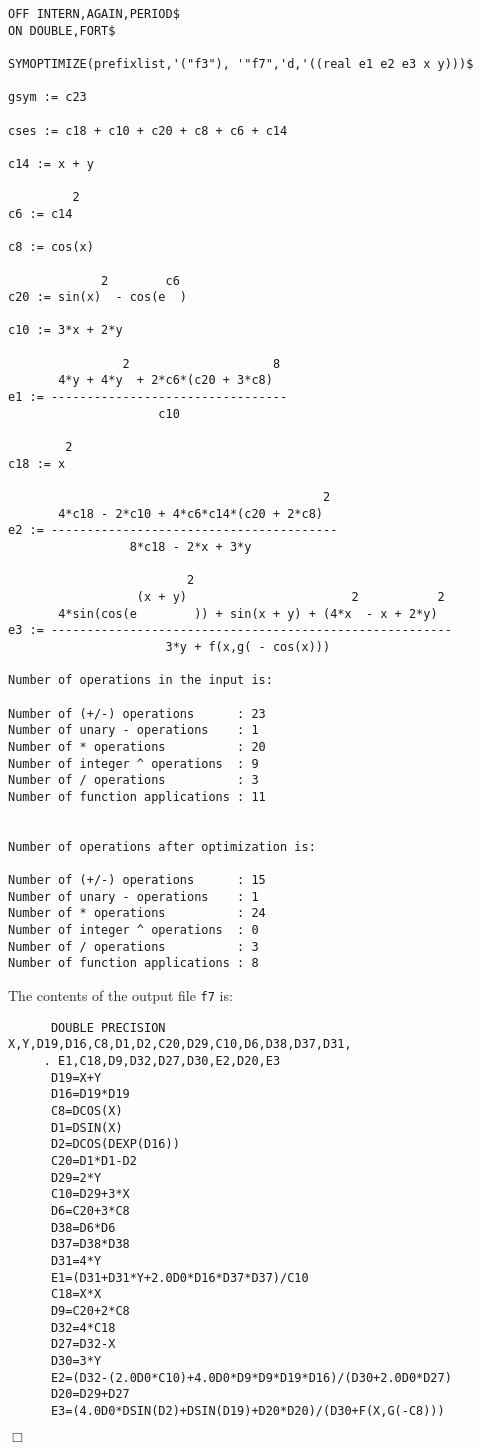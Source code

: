 {\small
\begin{verbatim}
OFF INTERN,AGAIN,PERIOD$
ON DOUBLE,FORT$

SYMOPTIMIZE(prefixlist,'("f3"), '"f7",'d,'((real e1 e2 e3 x y)))$

gsym := c23

cses := c18 + c10 + c20 + c8 + c6 + c14

c14 := x + y

         2
c6 := c14

c8 := cos(x)

             2        c6
c20 := sin(x)  - cos(e  )

c10 := 3*x + 2*y

                2                    8
       4*y + 4*y  + 2*c6*(c20 + 3*c8)
e1 := ---------------------------------
                     c10

        2
c18 := x

                                            2
       4*c18 - 2*c10 + 4*c6*c14*(c20 + 2*c8)
e2 := ----------------------------------------
                 8*c18 - 2*x + 3*y

                         2
                  (x + y)                       2           2
       4*sin(cos(e        )) + sin(x + y) + (4*x  - x + 2*y)
e3 := --------------------------------------------------------
                      3*y + f(x,g( - cos(x)))

Number of operations in the input is:

Number of (+/-) operations      : 23
Number of unary - operations    : 1
Number of * operations          : 20
Number of integer ^ operations  : 9
Number of / operations          : 3
Number of function applications : 11


Number of operations after optimization is:

Number of (+/-) operations      : 15
Number of unary - operations    : 1
Number of * operations          : 24
Number of integer ^ operations  : 0
Number of / operations          : 3
Number of function applications : 8
\end{verbatim}}

The contents of the output file {\tt f7} is:
{\small
\begin{verbatim}
      DOUBLE PRECISION X,Y,D19,D16,C8,D1,D2,C20,D29,C10,D6,D38,D37,D31,
     . E1,C18,D9,D32,D27,D30,E2,D20,E3
      D19=X+Y
      D16=D19*D19
      C8=DCOS(X)
      D1=DSIN(X)
      D2=DCOS(DEXP(D16))
      C20=D1*D1-D2
      D29=2*Y
      C10=D29+3*X
      D6=C20+3*C8
      D38=D6*D6
      D37=D38*D38
      D31=4*Y
      E1=(D31+D31*Y+2.0D0*D16*D37*D37)/C10
      C18=X*X
      D9=C20+2*C8
      D32=4*C18
      D27=D32-X
      D30=3*Y
      E2=(D32-(2.0D0*C10)+4.0D0*D9*D9*D19*D16)/(D30+2.0D0*D27)
      D20=D29+D27
      E3=(4.0D0*DSIN(D2)+DSIN(D19)+D20*D20)/(D30+F(X,G(-C8)))
\end{verbatim}
\begin{flushright}
$\Box$
\end{flushright}}

